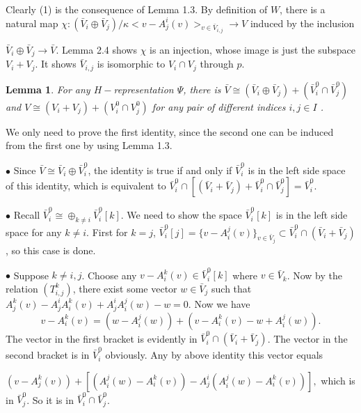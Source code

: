 \def\CTEXPreproc{Created by ctex v0.2.12, don't edit!}\documentclass[11pt]{article}
\newtheorem{lem}{Lemma}[section]
\begin{document}
 \begin{pf} Clearly (1) is the consequence of Lemma 1.3.  By definition of $W$, there is a natural map
 $ \chi  :  ( \bar{V}_i \oplus \bar{V}_j  )/ \kappa < v-A^i _j (v)   >_{v\in \bar{V}_{i,j}} \rightarrow V $ induced by the inclusion

 $  \bar{V}_i \oplus \bar{V}_j  \rightarrow \bar{V}  $.  Lemma 2.4 shows $\chi$ is an injection, whose image is just the subspace
 $V_i + V_j$. It shows $\bar{V}_{i,j}$ is isomorphic to $V_i \cap V_j$ through $p$.


 \end{pf}








\begin{lem}
For any $H-$representation $\Psi$, there is
$\bar{V}\cong (\bar{V}_i \oplus \bar{V}_j ) + ( \bar{V}^0 _{i} \cap \bar{V}^0 _{j}   )$ and $    V\cong (V_i + V_j ) + ( V^0 _{i} \cap V^0 _{j} ) $  for any pair of different indices $i,j\in I$ .

\end{lem}

\begin{pf}
We only need to prove the first identity, since the second one can be induced from the first one by using Lemma 1.3.

\noindent$\bullet$ Since $\bar{V}\cong \bar{V}_i \oplus \bar{V}^0 _i $, the identity is true if and only if $\bar{V}^0 _i $ is in the left side space of this identity, which is equivalent to $\bar{V}^0 _i \cap [( \bar{V}_i + \bar{V}_j ) + \bar{V}^0 _i \cap \bar{V}^0 _j ]=\bar{V}^0 _i . $ %

\noindent$\bullet$ Recall $\bar{V}^0 _i \cong \oplus _{k\neq i} \bar{V}^0 _i [k]$. We need to show the space $\bar{V}^0 _i [k]$ is in the left side space for any $k\neq i$.  First for $k=j$,  $\bar{V}^0 _i [j] =\{  v-A^j _i (v) \}_{v\in \bar{V}_j } \subset    \bar{V}^0 _i \cap (\bar{V}_i + \bar{V}_j )$, so this case is done.

\noindent$\bullet$ Suppose $k\neq i,j$. Choose any $v- A^k _i (v) \in \bar{V}^0 _i [k]$ where $v\in \bar{V}_k $.  Now by the relation $(T^k _{i,j})$, there exist some vector $w\in \bar{V}_j $ such that $A^k _j (v) -A^i _j A^k _i (v) + A^i _j A^j _i (w) -w =0  $. Now we have
\[
v-A^k _i (v) = (w- A^j _i (w)) + ( v-A^k _i (v) -w + A^j _i (w)  ).
\]
The vector in the first bracket is evidently in $\bar{V}^0 _i \cap (\bar{V}_i + \bar{V}_j )$. The vector in the second bracket is in $\bar{V}^0 _i $ obviously. Any by above identity this vector equals

$(v-A^k _j (v)) + [ ( A^j _i (w) -A^k _i (v) ) - A^i _j ( A^j _i (w) - A^k _i (v)  )    ],$
which is in $\bar{V}^0 _j $. So it is in $\bar{V}^0 _i \cap \bar{V}^0 _j $.\\



\end{pf}
\end{document}
